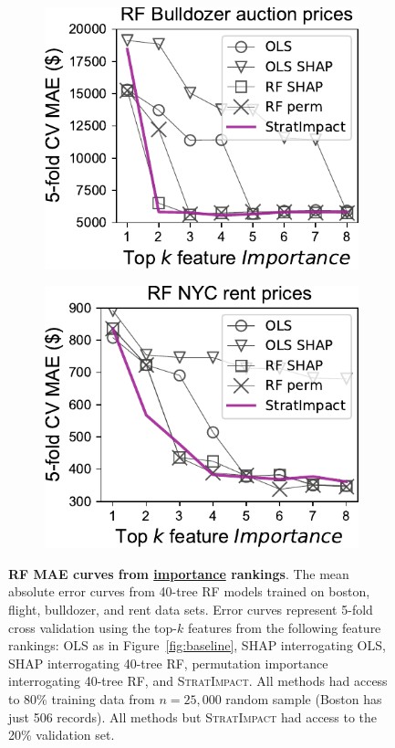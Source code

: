 \documentclass[11pt]{article}
\newcommand{\figref}[1]{Figure~\ref{#1}}
\newcommand{\simp}{\fontfamily{cmr}\textsc{\small StratImpact}}
\begin{document}
\begin{figure}
\begin{subfigure}{.245\textwidth}
\includegraphics[scale=0.45]{images/bulldozer-topk-RF-Importance.pdf}
\subcaption{}
\end{subfigure}%
\hfill
\begin{subfigure}{.245\textwidth}
    \centering
\includegraphics[scale=0.45]{images/rent-topk-RF-Importance.pdf}
\subcaption{}
\end{subfigure}
\caption[short]{\small {\bf RF MAE curves from \underline{importance} rankings}. The mean absolute error curves from 40-tree RF models trained on boston, flight, bulldozer, and rent data sets. Error curves represent 5-fold cross validation using the top-$k$ features from the following feature rankings: OLS as in \figref{fig:baseline}, SHAP interrogating OLS, SHAP interrogating 40-tree RF, permutation importance interrogating 40-tree RF, and \simp{}. All methods had access to 80\% training data from $n=25,000$ random sample (Boston has just 506 records).  All methods but \simp{} had access to the 20\% validation set.}
\label{fig:topk}
\end{figure}
\end{document}
